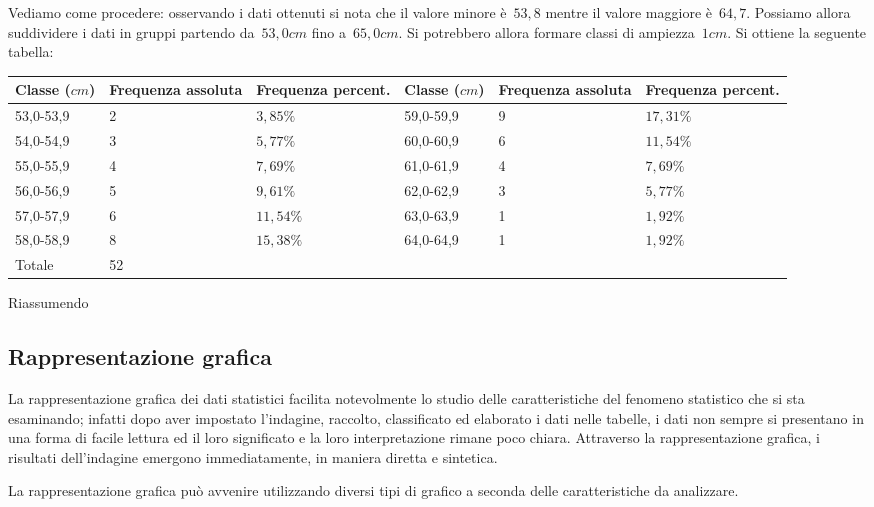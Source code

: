 \begin{exrig}
\begin{esempio}
Vediamo come procedere: osservando i dati ottenuti si nota che il valore minore è~$53,8$ mentre il valore maggiore è~$64,7$. Possiamo allora suddividere
i dati in gruppi partendo da~$53,0 \unit{cm}$ fino a~$65,0 \unit{cm}$. Si potrebbero allora formare classi di ampiezza~$1 \unit{cm}$.
Si ottiene la seguente tabella:

\begin{tabularx}{.9\textwidth}{*{2}{lXX}}
\toprule
Classe ($\unit{cm}$) & Frequenza assoluta & Frequenza percent. &Classe ($\unit{cm}$) & Frequenza assoluta & Frequenza percent. \\
\midrule
53,0-53,9 & 2 & $3,85\%$ & 59,0-59,9 & 9 & $17,31\%$\\
54,0-54,9 & 3 & $5,77\%$ & 60,0-60,9 & 6 & $11,54\%$\\
55,0-55,9 & 4 & $7,69\%$ & 61,0-61,9 & 4 & $7,69\%$\\
56,0-56,9 & 5 & $9,61\%$ & 62,0-62,9 & 3 & $5,77\%$\\
57,0-57,9 & 6 & $11,54\%$ & 63,0-63,9 & 1 & $1,92\%$\\
58,0-58,9 & 8 & $15,38\%$ & 64,0-64,9 & 1 & $1,92\%$\\
\midrule
Totale & 52 & &&&\\
\bottomrule
\end{tabularx}
\end{esempio}
\end{exrig}
\newpage
Riassumendo
\begin{center}
 
\end{center}


\subsection{Rappresentazione grafica}

La rappresentazione grafica dei dati statistici facilita notevolmente lo studio delle caratteristiche del
fenomeno statistico che si sta esaminando; infatti dopo aver impostato l'indagine, raccolto, classificato ed elaborato i dati nelle tabelle,
i dati non sempre si presentano in una forma di facile lettura ed il loro significato e la loro interpretazione rimane poco chiara.
Attraverso la rappresentazione grafica, i risultati dell'indagine emergono immediatamente, in maniera diretta e sintetica.

La rappresentazione grafica può avvenire utilizzando diversi tipi di grafico a seconda delle caratteristiche da
analizzare.

